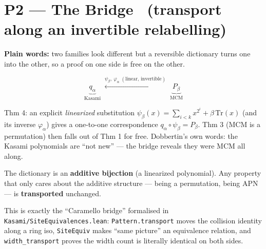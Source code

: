 \documentclass[11pt]{article}
\begin{document}
\section{P2 --- The Bridge \ (transport along an invertible relabelling)}

\textbf{Plain words:} two families look different but a reversible dictionary
turns one into the other, so a proof on one side is free on the other.

\[
  \underbrace{q_\alpha}_{\text{Kasami}}
  \;\overset{\psi_\beta,\ \varphi_\alpha\;(\text{linear, invertible})}{\longleftrightarrow}\;
  \underbrace{P_\beta}_{\text{MCM}}
\]

\begin{center}
\qquad
{}
\end{center}

\begin{remarkbox}
Thm 4: an explicit \emph{linearized} substitution
$\psi_\beta(x)=\sum_{i<k}x^{2^i}+\beta\,\mathrm{Tr}(x)$ (and its inverse
$\varphi_\alpha$) gives a one-to-one correspondence
$q_\alpha\!\circ\!\psi_\beta = P_\beta$. Thm 3 (MCM is a permutation) then
falls out of Thm 1 for free. Dobbertin's own words: the Kasami polynomials are
``not new'' --- the bridge reveals they were MCM all along.
\end{remarkbox}

\begin{coolfact}
The dictionary is an \textbf{additive bijection} (a linearized polynomial). Any
property that only cares about the additive structure --- being a permutation,
being APN --- is \textbf{transported} unchanged.
\end{coolfact}

\begin{leanbox}
This is exactly the ``Caramello bridge'' formalised in
\texttt{Kasami/SiteEquivalences.lean}: \texttt{Pattern.transport} moves the
collision identity along a ring iso, \texttt{SiteEquiv} makes ``same picture''
an equivalence relation, and \texttt{width\_transport} proves the width count is
literally identical on both sides.
\end{leanbox}
\end{document}
